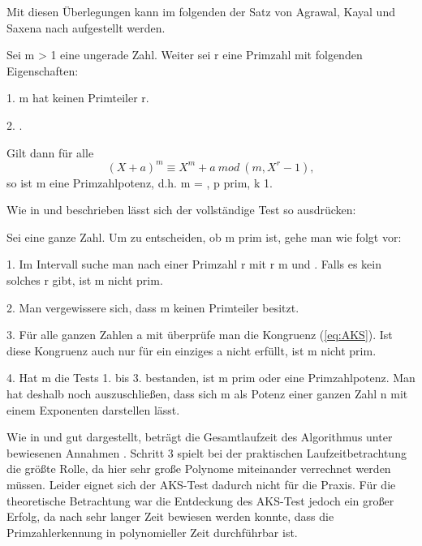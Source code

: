 		Mit diesen Überlegungen kann im folgenden der Satz von Agrawal, Kayal und Saxena nach \cite{Algorithmische:Zahlentheorie} aufgestellt werden.
		
		Sei m > 1 eine ungerade Zahl. Weiter sei r eine Primzahl mit folgenden Eigenschaften:
		
		1. m hat keinen Primteiler \myMathRM{\leq} r.
		
		2. .
		
		Gilt dann für alle 
		\begin{equation} \label{eq:AKS}		
			(X + a)^m \equiv X^m + a~mod~(m,X^r - 1),
		\end{equation}
		so ist m eine Primzahlpotenz, d.h. m = , p prim, k \myMathRM{\geq} 1.
		
		Wie in \cite{Algorithmische:Zahlentheorie} und \cite{Algebraische:und:zahlentheoretische:Grundlagen:fuer:die:Informatik} beschrieben lässt sich der vollständige Test so ausdrücken:
		
		Sei  eine ganze Zahl. Um zu entscheiden, ob m prim ist, gehe man
		wie folgt vor:
		
		1. Im Intervall  suche man nach einer Primzahl r mit
		r \myNichtTeiler m und .
		Falls es kein solches r gibt, ist m nicht prim.
		
		2. Man vergewissere sich, dass m keinen Primteiler  besitzt.
		
		3. Für alle ganzen Zahlen a mit  überprüfe man die Kongruenz (\ref{eq:AKS}).
		Ist diese Kongruenz auch nur für ein einziges a nicht erfüllt, ist m nicht prim.
		
		4. Hat m die Tests 1. bis 3. bestanden, ist m prim oder eine Primzahlpotenz.
		Man hat deshalb noch auszuschließen, dass sich m als Potenz  einer
		ganzen Zahl n mit einem Exponenten  darstellen lässt.
		
		Wie in \cite{Algorithmische:Zahlentheorie} und \cite{Algebraische:und:zahlentheoretische:Grundlagen:fuer:die:Informatik} gut dargestellt, beträgt die Gesamtlaufzeit des Algorithmus unter bewiesenen Annahmen . Schritt 3 spielt bei der praktischen Laufzeitbetrachtung die größte Rolle, da hier sehr große Polynome miteinander verrechnet werden müssen. Leider eignet sich der AKS-Test dadurch nicht für die Praxis. Für die theoretische Betrachtung war die Entdeckung des AKS-Test jedoch ein großer Erfolg, da nach sehr langer Zeit bewiesen werden konnte, dass die Primzahlerkennung in polynomieller Zeit durchführbar ist.
		